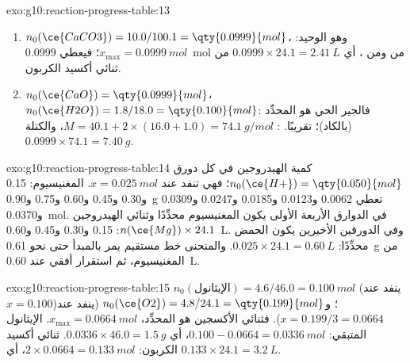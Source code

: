 \begin{solution}{exo:g10:reaction-progress-table:13}
\begin{enumerate}
  \item $n_0(\ce{CaCO3}) = 10.0 / 100.1 = \qty{0.0999}{mol}$، وهو 
        الوحيد: $x_{\max} = \qty{0.0999}{mol}$؛ فيعطي
        \qty{0.0999}{mol} من  ومن ، أي
        $0.0999 \times 24.1 = \qty{2.41}{L}$ من ثنائي أكسيد الكربون.
  \item $n_0(\ce{CaO}) = \qty{0.0999}{mol}$، $n_0(\ce{H2O}) = 1.8 / 18.0
        = \qty{0.100}{mol}$: فالجير الحي هو المحدِّد (بالكاد)؛  تقريبًا. :
        $M = 40.1 + 2 \times (16.0 + 1.0) = \qty{74.1}{g/mol}$، والكتلة
        $0.0999 \times 74.1 = \qty{7.40}{g}$.
\end{enumerate}
\end{solution}

\begin{solution}{exo:g10:reaction-progress-table:14}
كمية  الهيدروجين في كل دورق $n_0(\ce{H+}) = \qty{0.050}{mol}$؛ فهي تنفد عند
$x = \qty{0.025}{mol}$. المغنيسيوم: 0.15 و0.30 و0.45 و0.60 و0.75
و\qty{0.90}{g} تعطي 0.0062 و0.0123 و0.0185 و0.0247 و0.0309
و\qty{0.0370}{mol}. في الدوارق الأربعة الأولى يكون المغنيسيوم محدِّدًا
وثنائي الهيدروجين $n(\ce{Mg}) \times 24.1$: 0.15 و0.30 و0.45
و\qty{0.60}{L}. وفي الدورقين الأخيرين يكون الحمض محدِّدًا: $0.025 \times 24.1
= \qty{0.60}{L}$. والمنحنى خط مستقيم يمر بالمبدأ حتى
نحو \qty{0.61}{g} من المغنيسيوم، ثم استقرار أفقي عند
\qty{0.60}{L}.
\end{solution}

\begin{solution}{exo:g10:reaction-progress-table:15}
$n_0(\text{الإيثانول}) = 4.6 / 46.0 = \qty{0.100}{mol}$ (ينفد عند
$x = 0.100$)؛ و$n_0(\ce{O2}) = 4.8 / 24.1 = \qty{0.199}{mol}$ (ينفد
عند $x = 0.199/3 = 0.0664$). فثنائي الأكسجين هو المحدِّد،
$x_{\max} = \qty{0.0664}{mol}$. الإيثانول المتبقي: $0.100 - 0.0664 =
\qty{0.0336}{mol}$، أي $0.0336 \times 46.0 = \qty{1.5}{g}$. ثنائي أكسيد
الكربون: $2 \times 0.0664 = \qty{0.133}{mol}$، أي
$0.133 \times 24.1 = \qty{3.2}{L}$.
\end{solution}


